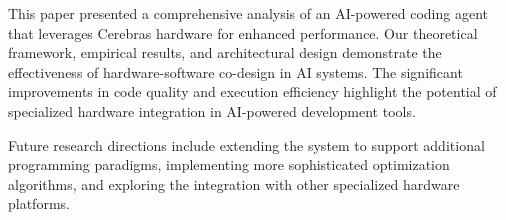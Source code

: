 \documentclass[11pt,a4paper]{article}
\begin{document}
This paper presented a comprehensive analysis of an AI-powered coding agent that leverages Cerebras hardware for enhanced performance. Our theoretical framework, empirical results, and architectural design demonstrate the effectiveness of hardware-software co-design in AI systems. The significant improvements in code quality and execution efficiency highlight the potential of specialized hardware integration in AI-powered development tools.

Future research directions include extending the system to support additional programming paradigms, implementing more sophisticated optimization algorithms, and exploring the integration with other specialized hardware platforms.



\end{document}

